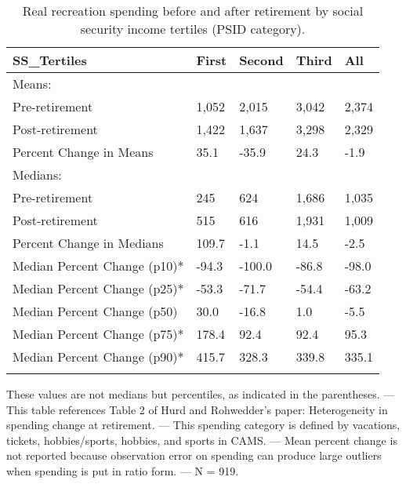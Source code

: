 \begin{table}[tbp] \centering
{}

\caption{Real recreation spending before and after retirement by social security income tertiles (PSID category).}
\begin{tabularx}{\textwidth}{lCCCC}

\toprule
{SS\_Tertiles}&{First}&{Second}&{Third}&{All} \tabularnewline
\midrule\addlinespace[1.5ex]
Means:&&&& \tabularnewline
\midrule Pre-retirement&1,052&2,015&3,042&2,374 \tabularnewline
Post-retirement&1,422&1,637&3,298&2,329 \tabularnewline
Percent Change in Means&35.1&-35.9&24.3&-1.9 \tabularnewline
\midrule Medians:&&&& \tabularnewline
\midrule Pre-retirement&245&624&1,686&1,035 \tabularnewline
Post-retirement&515&616&1,931&1,009 \tabularnewline
Percent Change in Medians&109.7&-1.1&14.5&-2.5 \tabularnewline
Median Percent Change (p10)*&-94.3&-100.0&-86.8&-98.0 \tabularnewline
Median Percent Change (p25)*&-53.3&-71.7&-54.4&-63.2 \tabularnewline
Median Percent Change (p50)&30.0&-16.8&1.0&-5.5 \tabularnewline
Median Percent Change (p75)*&178.4&92.4&92.4&95.3 \tabularnewline
Median Percent Change (p90)*&415.7&328.3&339.8&335.1 \tabularnewline
\bottomrule \addlinespace[1.5ex]

\end{tabularx}
\begin{flushleft}
\footnotesize *These values are not medians but percentiles, as indicated in the parentheses. \linebreak --- \linebreak This table references Table 2 of Hurd and Rohwedder's paper: Heterogeneity in spending change at retirement. \linebreak --- \linebreak This spending category is defined by vacations, tickets, hobbies/sports, hobbies, and sports in CAMS. \linebreak --- \linebreak Mean percent change is not reported because observation error on spending can produce large outliers when spending is put in ratio form. \linebreak --- \linebreak N = 919.
\end{flushleft}
\end{table}

